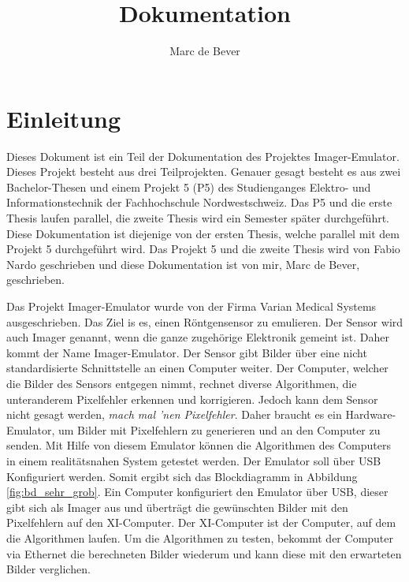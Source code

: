 \documentclass{article}
\title{Dokumentation}
\author{Marc de Bever}
\begin{document}
\maketitle
\tableofcontents

\section{Einleitung}
Dieses Dokument ist ein Teil der Dokumentation des Projektes Imager-Emu\-lator. Dieses Projekt besteht aus drei Teilprojekten. 
Genauer gesagt besteht es aus zwei Bachelor-Thesen und einem Projekt 5 (P5) des Studienganges Elektro- und Informationstechnik der Fachhochschule Nordwestschweiz. 
Das P5 und die erste Thesis laufen parallel, die zweite Thesis wird ein Semester später durchgeführt. Diese Dokumentation ist diejenige von der ersten Thesis, welche parallel mit dem Projekt 5 durchgeführt wird. Das Projekt 5 und die zweite Thesis wird von Fabio Nardo geschrieben und diese Dokumentation ist von mir, Marc de Bever, geschrieben. 

Das Projekt Imager-Emulator wurde von der Firma Varian Medical Systems ausgeschrieben. Das Ziel is es, einen Röntgensensor zu emulieren. Der Sensor wird auch Imager genannt, wenn die ganze zugehörige Elektronik gemeint ist. Daher kommt der Name Imager-Emulator. Der Sensor gibt Bilder über eine nicht standardisierte Schnittstelle an einen Computer weiter. Der Computer, welcher die Bilder des Sensors entgegen nimmt, rechnet diverse Algorithmen, die unteranderem Pixelfehler erkennen und korrigieren. Jedoch kann dem Sensor nicht gesagt werden, \textit{mach mal 'nen Pixelfehler}. Daher braucht es ein Hardware-Emulator, um Bilder mit Pixelfehlern zu generieren und an den Computer zu senden. Mit Hilfe von diesem Emulator können die Algorithmen des Computers in einem realitätsnahen System getestet werden. Der Emulator soll über USB Konfiguriert werden. Somit ergibt sich das Blockdiagramm in Abbildung \ref{fig:bd_sehr_grob}. Ein Computer konfiguriert den Emulator über USB, dieser gibt sich als Imager aus und überträgt die gewünschten Bilder mit den Pixelfehlern auf den XI-Computer. Der XI-Computer ist der Computer, auf dem die Algorithmen laufen. Um die Algorithmen zu testen, bekommt der Computer via Ethernet die berechneten Bilder wiederum  und kann diese mit den erwarteten Bilder verglichen.
\end{document}
